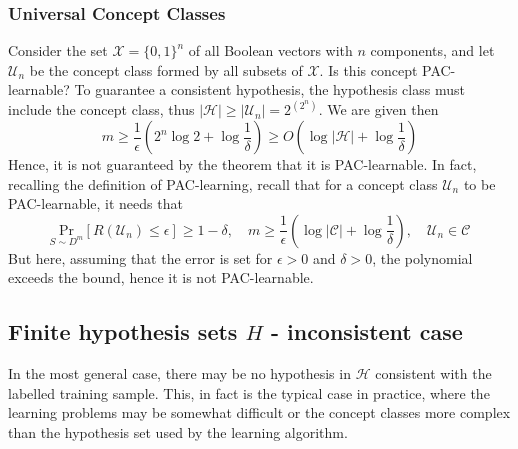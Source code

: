 \subsubsection{Universal Concept Classes}
Consider the set $\mathcal{X}=\{ 0,1 \}^{n}$ of all Boolean vectors with $n$ components, and let $\mathcal{U}_{n}$ be the concept class formed by all subsets of $\mathcal{X}$. Is this concept PAC-learnable? To guarantee a consistent hypothesis, the hypothesis class must include the concept class, thus $\lvert \mathcal{H} \rvert\geq \lvert \mathcal{U}_{n} \rvert=2^{(2^{n})}$. We are given then \begin{equation}
    m\geq \frac{1}{\epsilon}\left( 2^{n}\log{2}+\log{\frac{1}{\delta}} \right)\geq O\left( \log{\lvert \mathcal{H} \rvert +\log{\frac{1}{\delta}}} \right)
\end{equation}
Hence, it is not guaranteed by the theorem that it is PAC-learnable. In fact, recalling the definition of PAC-learning, recall that for a concept class $\mathcal{U}_{n}$ to be PAC-learnable, it needs that 
\begin{equation}
    \underset{S\sim D^{m}}{\mathrm{Pr}}[R(\mathcal{U}_{n})\leq \epsilon]\geq 1-\delta,\quad m \geq \frac{1}{\epsilon} \left( \log{\lvert \mathcal{C} \rvert }+\log{\frac{1}{\delta}} \right),\quad\mathcal{U}_{n}\in\mathcal{C}
\end{equation}
But here, assuming that the error is set for $\epsilon>0$ and $\delta>0$, the polynomial exceeds the bound, hence it is not PAC-learnable. 

\subsection{Finite hypothesis sets $H$ - inconsistent case}

In the most general case, there may be no hypothesis in $\mathcal{H}$ consistent with the labelled training sample. This, in fact is the typical case in practice, where the learning problems may be somewhat difficult or the concept classes more complex than the hypothesis set used by the learning algorithm. 

